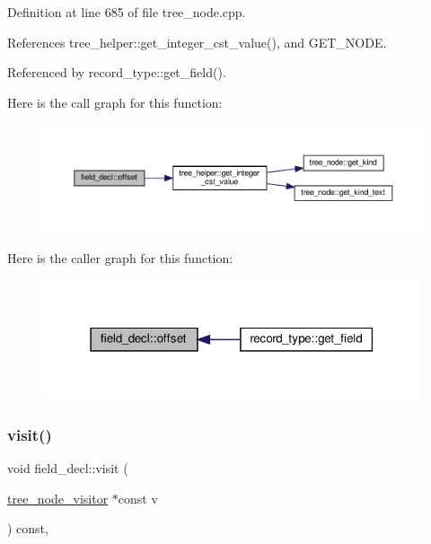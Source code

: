Definition at line 685 of file tree\+\_\+node.\+cpp.



References tree\+\_\+helper\+::get\+\_\+integer\+\_\+cst\+\_\+value(), and G\+E\+T\+\_\+\+N\+O\+DE.



Referenced by record\+\_\+type\+::get\+\_\+field().

Here is the call graph for this function\+:
\nopagebreak
\begin{figure}[H]
\begin{center}
\leavevmode
\includegraphics[width=350pt]{d9/d49/structfield__decl_a7ed575f4c4833c1be181bd962e1c1966_cgraph}
\end{center}
\end{figure}
Here is the caller graph for this function\+:
\nopagebreak
\begin{figure}[H]
\begin{center}
\leavevmode
\includegraphics[width=315pt]{d9/d49/structfield__decl_a7ed575f4c4833c1be181bd962e1c1966_icgraph}
\end{center}
\end{figure}
\mbox{\label{structfield__decl_a68ef82bb50b2ebdaa89d1702aa01065e}} 
\subsubsection{\texorpdfstring{visit()}{visit()}}
{\footnotesize\ttfamily void field\+\_\+decl\+::visit (\begin{DoxyParamCaption}\item[{\hyperlink{classtree__node__visitor}{tree\+\_\+node\+\_\+visitor} $\ast$const}]{v }\end{DoxyParamCaption}) const\hspace{0.3cm}{\ttfamily [override]}, {\ttfamily [virtual]}}



